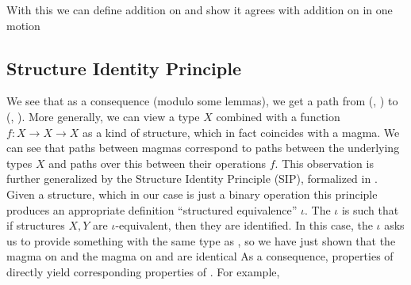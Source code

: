 With this we can define addition on \bL{} and show it agrees with addition on \bN{} in one motion

\subsection{Structure Identity Principle}
We see that as a consequence (modulo some  lemmas), we get a path from (\bN{}, ) to (\bL{}, ). More generally, we can view a type $X$ combined with a function $f: X \to X \to X$ as a kind of structure, which in fact coincides with a magma. We can see that paths between magmas correspond to paths between the underlying types $X$ and paths over this between their operations $f$. This observation is further generalized by the Structure Identity Principle (SIP), formalized in \cite{iri}. Given a structure, which in our case is just a binary operation
this principle produces an appropriate definition ``structured equivalence'' $\iota$. The $\iota$ is such that if structures $X, Y$ are $\iota$-equivalent, then they are identified. In this case, the $\iota$ asks us to provide something with the same type as , so we have just shown that the  magma on \bL{}
and the \AgdaFunction{\_+\_} magma on \bN{} and are identical
As a consequence, properties of \AgdaFunction{\_+\_} directly yield corresponding properties of . For example,
